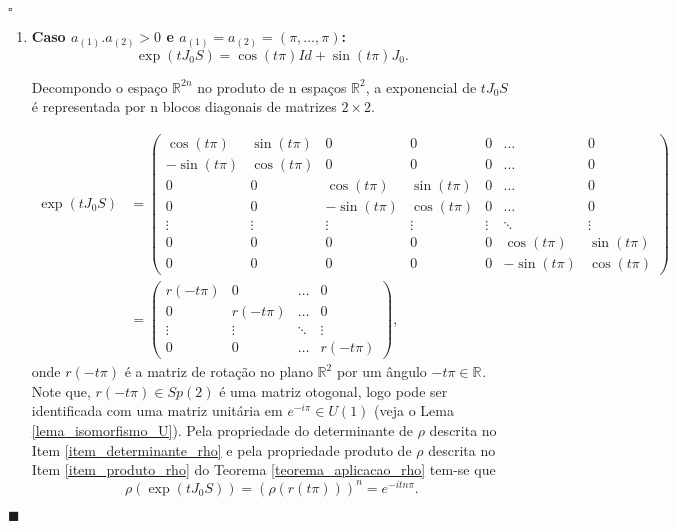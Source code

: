 \documentclass[12pt]{book}
\newenvironment{prova}[1]{$\square$ #1}{\hfill$\blacksquare$}
\newcommand{\estruturacomplexa}{J_{0}}
\newcommand{\gruposimpletico}[1]{Sp(#1)}
\newcommand{\real}[1]{\mathbb{R}^{#1}}
\newcommand{\reta}{\real{}}
\begin{document}
\begin{prova}
\begin{enumerate}
			\begin{enumerate}
				\item \textbf{Caso $a_{(1)}.a_{(2)}>0$ e $a_{(1)} = a_{(2)} = (\pi,\dots,\pi)$:}
				$$
				\exp(t\estruturacomplexa S) 
				= 
				\cos(t\pi)Id+ \sin(t\pi)\estruturacomplexa.
				$$
				
				Decompondo o espaço $\real{2n}$ no produto de n espaços $\real{2}$, a exponencial de $t\estruturacomplexa S$ é representada por n blocos diagonais de matrizes $2\times 2$.
				
				$$
				\begin{aligned}
					\exp(t\estruturacomplexa S) 
					&=
					\left(
					\begin{array}{ccccccc}
					\cos(t\pi) & \sin(t\pi) & 0 & 0 & 0 & \dots & 0
					\\
					-\sin(t\pi) & \cos(t\pi) & 0 & 0 & 0 & \dots & 0  
					\\
					0 & 0 & \cos(t\pi) & \sin(t\pi) & 0 & \dots & 0
					\\
					0 & 0 & -\sin(t\pi) & \cos(t\pi) & 0 & \dots & 0
					\\
					\vdots & \vdots & \vdots & \vdots & \vdots & \ddots & \vdots
					\\
					0 & 0 & 0 & 0 & 0 & \cos(t\pi) & \sin(t\pi)
					\\
					0 & 0 & 0 & 0 & 0 & -\sin(t\pi) & \cos(t\pi)
					\end{array}
					\right)
					\\
					&=
					\left(
					\begin{array}{ccccc}
					r(-t\pi) & 0 &\dots & 0 
					\\
					0 & r(-t\pi) &\dots & 0 
					\\
					\vdots & \vdots & \ddots & \vdots 
					\\
					0 & 0 & \dots & r(-t\pi)
					\end{array}
					\right),
				\end{aligned}
				$$
				onde $r(-t\pi)$ é a matriz de rotação no plano $\real{2}$ por um ângulo $-t\pi \in \reta$. Note que, $r(-t\pi) \in \gruposimpletico{2}$ é uma matriz otogonal, logo pode ser identificada com uma matriz unitária em $e^{-i\pi}\in U(1)$ (veja o Lema \ref{lema_isomorfismo_U}). Pela propriedade do determinante de $\rho$ descrita no Item \ref{item_determinante_rho} e pela propriedade produto de $\rho$ descrita no Item \ref{item_produto_rho} do Teorema \ref{teorema_aplicacao_rho} tem-se que 
				$$
				\rho(\exp(t\estruturacomplexa S)) = (\rho(r(t\pi)))^{n} = e^{-itn\pi}.
				$$ 
				

\end{enumerate}
\end{enumerate}
\end{prova}
\end{document}
